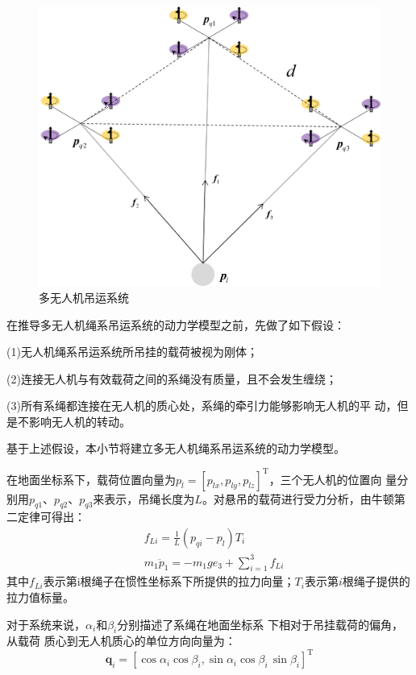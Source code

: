 \documentclass[lang=chs, degree=master, blindreview=false, winfonts=true]{yanputhesis}
\begin{document}
\begin{figure}[hbt!]
	\centering
	\includegraphics[width=28pc]{picture/2_3.png} 
	\caption{多无人机吊运系统} \label{2_3}
\end{figure}

在推导多无人机绳系吊运系统的动力学模型之前，先做了如下假设：



(1)无人机绳系吊运系统所吊挂的载荷被视为刚体； 


(2)连接无人机与有效载荷之间的系绳没有质量，且不会发生缠绕；

(3)所有系绳都连接在无人机的质心处，系绳的牵引力能够影响无人机的平
动，但是不影响无人机的转动。 

基于上述假设，本小节将建立多无人机绳系吊运系统的动力学模型。


在地面坐标系下，载荷位置向量为$p_{l}=[p_{lx},p_{ly},p_{lz}]^{\mathrm{T}}$，三个无人机的位置向
量分别用$p_{q1}$、$p_{q2}$、$p_{q3}$来表示，吊绳长度为$L$。对悬吊的载荷进行受力分析，由牛顿第二定律可得出：
\begin{equation}
	\label{2-15}
	\begin{aligned}
		&f_{Li}=\frac{1}{L}(p_{qi}-p_{l})T_{i} \\
		&m_{1}\ddot{p}_{1}=-m_{1}ge_{3}+\sum_{i=1}^{3}f_{Li}
	\end{aligned}
\end{equation}
其中$f_{Li}$表示第i根绳子在惯性坐标系下所提供的拉力向量；$T_{i}$表示第$i$根绳子提供的拉力值标量。

对于系统来说，$\alpha_{i}$和$\beta_i$分别描述了系绳在地面坐标系 下相对于吊挂载荷的偏角，从载荷
质心到无人机质心的单位方向向量为：
\begin{equation}
	\boldsymbol{q}_i=\left[\cos\alpha_i\cos\beta_i,\sin\alpha_i\cos\beta_i\,\sin\beta_i\right]^\mathrm T
\end{equation}
\end{document}
